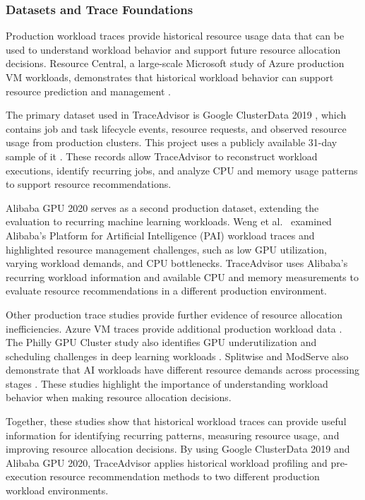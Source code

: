\subsubsection{Datasets and Trace Foundations}\label{sec:1.3.2}

Production workload traces provide historical resource usage data that can be used to understand workload behavior and support future resource allocation decisions. Resource Central, a large-scale Microsoft study of Azure production VM workloads, demonstrates that historical workload behavior can support resource prediction and management \cite{ref2}.

The primary dataset used in TraceAdvisor is Google ClusterData 2019 \cite{ref7}, which contains job and task lifecycle events, resource requests, and observed resource usage from production clusters. This project uses a publicly available 31-day sample of it \cite{ref8}. These records allow TraceAdvisor to reconstruct workload executions, identify recurring jobs, and analyze CPU and memory usage patterns to support resource recommendations.

Alibaba GPU 2020 \cite{ref19} serves as a second production dataset, extending the evaluation to recurring machine learning workloads. Weng et al.~\cite{ref9} examined Alibaba's Platform for Artificial Intelligence (PAI) workload traces and highlighted resource management challenges, such as low GPU utilization, varying workload demands, and CPU bottlenecks. TraceAdvisor uses Alibaba's recurring workload information and available CPU and memory measurements to evaluate resource recommendations in a different production environment.

Other production trace studies provide further evidence of resource allocation inefficiencies. Azure VM traces provide additional production workload data \cite{ref10}. The Philly GPU Cluster study also identifies GPU underutilization and scheduling challenges in deep learning workloads \cite{ref11}. Splitwise and ModServe also demonstrate that AI workloads have different resource demands across processing stages \cite{ref12,ref13}. These studies highlight the importance of understanding workload behavior when making resource allocation decisions.

Together, these studies show that historical workload traces can provide useful information for identifying recurring patterns, measuring resource usage, and improving resource allocation decisions. By using Google ClusterData 2019 and Alibaba GPU 2020, TraceAdvisor applies historical workload profiling and pre-execution resource recommendation methods to two different production workload environments.

